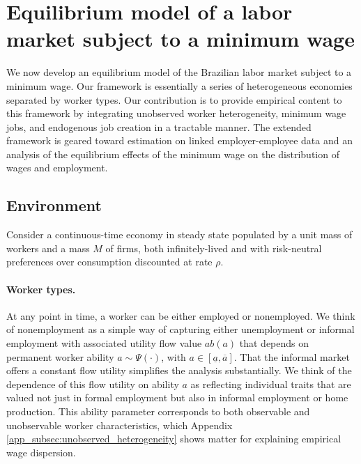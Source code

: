 
\section{Equilibrium model of a labor market subject to a minimum wage\label{SECTION: Model}}

We now develop an equilibrium model of the Brazilian labor market subject to a minimum wage. Our framework is essentially a series of heterogeneous \citet{BurdettMortensen1998} economies separated by worker types. Our contribution is to provide empirical content to this framework by integrating unobserved worker heterogeneity, minimum wage jobs, and endogenous job creation in a tractable manner. The extended framework is geared toward estimation on linked employer-employee data and an analysis of the equilibrium effects of the minimum wage on the distribution of wages and employment. %

\subsection{Environment}

Consider a continuous-time economy in steady state populated by a unit mass of workers and a mass $M$ of firms, both infinitely-lived and with risk-neutral preferences over consumption discounted at rate $\rho$.


\paragraph{Worker types.}

At any point in time, a worker can be either employed or nonemployed. We think of nonemployment as a simple way of capturing either unemployment or informal employment with associated utility flow value $ab(a)$ that depends on permanent worker ability $a \sim \Psi(\cdot)$, with $a \in [\underline{a},\overline{a}]$. That the informal market offers a constant flow utility simplifies the analysis substantially. We think of the dependence of this flow utility on ability $a$ as reflecting individual traits that are valued not just in formal employment but also in informal employment or home production. This ability parameter corresponds to both observable and unobservable worker characteristics, which Appendix \ref{app_subsec:unobserved_heterogeneity} shows matter for explaining empirical wage dispersion.

